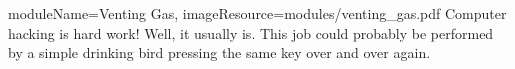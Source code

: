 \begin{needymodule}{
  moduleName=Venting Gas,
  imageResource=modules/venting_gas.pdf
}
{
  Computer hacking is hard work!
  Well, it usually is.
  This job could probably be performed by a simple drinking bird pressing the same key over and over again.
}
  \begin{bulletlist}
  \end{bulletlist}

\end{needymodule}
